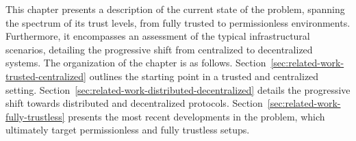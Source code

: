 This chapter presents a description of the current state of the \pol{} problem, spanning the spectrum of its trust levels, from fully trusted to permissionless environments. Furthermore, it encompasses an assessment of the typical infrastructural scenarios, detailing the progressive shift from centralized to decentralized systems. The organization of the chapter is as follows. Section~\ref{sec:related-work-trusted-centralized} outlines the starting point in a trusted and centralized setting. Section~\ref{sec:related-work-distributed-decentralized} details the progressive shift towards distributed and decentralized protocols. Section~\ref{sec:related-work-fully-trustless} presents the most recent developments in the \pol{} problem, which ultimately target permissionless and fully trustless setups. 

